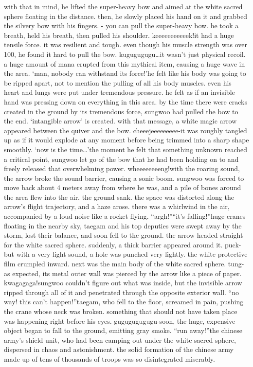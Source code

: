 with that in mind, he lifted the super-heavy bow and aimed at the white sacred sphere floating in the distance.
 then, he slowly placed his hand on it and grabbed the silvery bow with his fingers.
- you can pull the super-heavy bow.
he took a breath, held his breath, then pulled his shoulder.
keeeeeeeeeeek!it had a huge tensile force.
 it was resilient and tough.
 even though his muscle strength was over 100, he found it hard to pull the bow.
kugugugugu…it wasn’t just physical recoil.
 a huge amount of mana erupted from this mythical item, causing a huge wave in the area.
‘man, nobody can withstand its force!’he felt like his body was going to be ripped apart, not to mention the pulling of all his body muscles.
 even his heart and lungs were put under tremendous pressure.
 he felt as if an invisible hand was pressing down on everything in this area.
by the time there were cracks created in the ground by its tremendous force, sungwoo had pulled the bow to the end.
‘intangible arrow’ is created.
with that message, a white magic arrow appeared between the quiver and the bow.
cheeejeeeeeeeee-it was roughly tangled up as if it would explode at any moment before being trimmed into a sharp shape smoothly.
‘now is the time…’the moment he felt that something unknown reached a critical point, sungwoo let go of the bow that he had been holding on to and freely released that overwhelming power.
wheeeeeeeeng!with the roaring sound, the arrow broke the sound barrier, causing a sonic boom.
 sungwoo was forced to move back about 4 meters away from where he was, and a pile of bones around the area flew into the air.
the ground sank.
 the space was distorted along the arrow’s flight trajectory, and a haze arose.
 there was a whirlwind in the air, accompanied by a loud noise like a rocket flying.
“argh!”“it’s falling!”huge cranes floating in the nearby sky, taegam and his top deputies were swept away by the storm, lost their balance, and soon fell to the ground.
the arrow headed straight for the white sacred sphere.
 suddenly, a thick barrier appeared around it.
puck-but with a very light sound, a hole was punched very lightly.
the white protective film crumpled inward.
 next was the main body of the white sacred sphere.
tung-as expected, its metal outer wall was pierced by the arrow like a piece of paper.
kwagagaga!sungwoo couldn’t figure out what was inside, but the invisible arrow ripped through all of it and penetrated through the opposite exterior wall.
“no way! this can’t happen!”taegam, who fell to the floor, screamed in pain, pushing the crane whose neck was broken.
something that should not have taken place was happening right before his eyes.
gugugugugugu-soon, the huge, expensive object began to fall to the ground, emitting gray smoke.
“run away!”the chinese army’s shield unit, who had been camping out under the white sacred sphere, dispersed in chaos and astonishment.
the solid formation of the chinese army made up of tens of thousands of troops was so disintegrated miserably.


